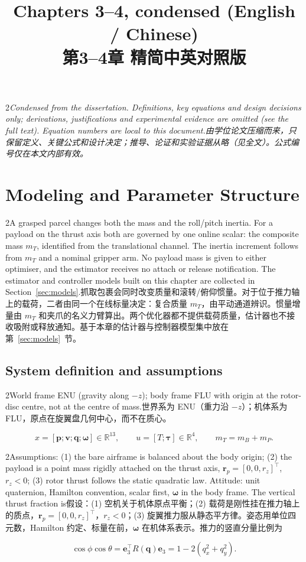 \documentclass[10pt,a4paper]{article}
\title{Chapters 3--4, condensed (English / Chinese)\\[2pt]
\large 第3--4章 精简中英对照版}
\date{}
\numberwithin{equation}{section}
\newcommand{\mB}{m_B}
\newcommand{\mP}{m_P}
\newcommand{\mT}{m_T}
\newcommand{\ev}{\bm{e}_3}
\newcommand{\rp}{\bm{r}_p}
\newcommand{\pair}[2]{\begin{paracol}{2}#1\switchcolumn #2\end{paracol}}
\newcommand{\bsec}[2]{\section{#1\quad{\normalfont\large #2}}}
\newcommand{\bsub}[2]{\needspace{8\baselineskip}\subsection{#1\quad{\normalfont #2}}}
\begin{document}
\maketitle
\vspace{-8mm}
\pair{\small\itshape Condensed from the dissertation. Definitions, key equations and design decisions
only; derivations, justifications and experimental evidence are omitted (see
the full text). Equation numbers are local to this document.}
{\small 由学位论文压缩而来，只保留定义、关键公式和设计决定；推导、论证和实验证据从略（见全文）。公式编号仅在本文内部有效。}

\setcounter{section}{2}
\bsec{Modeling and Parameter Structure}{建模与参数结构}

\pair{A grasped parcel changes both the mass and the roll/pitch inertia. For a
payload on the thrust axis both are governed by one online scalar: the
composite mass $\mT$, identified from the translational channel. The inertia
increment follows from $\mT$ and a nominal gripper arm. No payload mass is
given to either optimiser, and the estimator receives no attach or release
notification. The estimator and controller models built on this chapter are
collected in Section~\ref{sec:models}.}
{抓取包裹会同时改变质量和滚转/俯仰惯量。对于位于推力轴上的载荷，二者由同一个在线标量决定：复合质量 $\mT$，由平动通道辨识。惯量增量由 $\mT$ 和夹爪的名义力臂算出。两个优化器都不提供载荷质量，估计器也不接收吸附或释放通知。基于本章的估计器与控制器模型集中放在第~\ref{sec:models}~节。}

\bsub{System definition and assumptions}{系统定义与假设}

\pair{World frame ENU (gravity along $-z$); body frame FLU with origin at the
rotor-disc centre, not at the centre of mass.}
{世界系为 ENU（重力沿 $-z$）；机体系为 FLU，原点在旋翼盘几何中心，而不在质心。}
\begin{equation}
x=[\bm p;\bm v;\bm q;\bm\omega]\in\mathbb R^{13},\qquad
u=[T;\bm\tau]\in\mathbb R^{4},\qquad \mT=\mB+\mP .
\end{equation}
\pair{Assumptions: (1) the bare airframe is balanced about the body origin;
(2) the payload is a point mass rigidly attached on the thrust axis,
$\rp=[0,0,r_z]^\top$, $r_z<0$; (3) rotor thrust follows the static quadratic
law. Attitude: unit quaternion, Hamilton convention, scalar first,
$\bm\omega$ in the body frame. The vertical thrust fraction is}
{假设：(1) 空机关于机体原点平衡；(2) 载荷是刚性挂在推力轴上的质点，$\rp=[0,0,r_z]^\top$，$r_z<0$；(3) 旋翼推力服从静态平方律。姿态用单位四元数，Hamilton 约定、标量在前，$\bm\omega$ 在机体系表示。推力的竖直分量比例为}
\begin{equation}
\cos\phi\cos\theta=\ev^\top R(\bm q)\ev=1-2(q_x^2+q_y^2).
\label{eq:costheta}
\end{equation}
\end{document}
